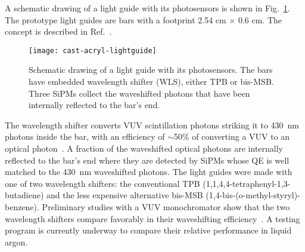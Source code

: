 A schematic drawing of a light guide with its photosensors is shown in
Fig.~\ref{fig:WaveguideSketch}. The prototype light guides are bars
with a footprint 2.54 cm $\times$ 0.6 cm.  The concept is described in
Ref.~\cite{bib:MITbars}.
\begin{figure}[ht]
  \begin{center}
    \texttt{[image: cast-acryl-lightguide]}
    \caption{Schematic drawing of a light guide with its
      photosensors. The bars have embedded wavelength shifter (WLS),
      either TPB or bis-MSB. Three SiPMs collect the waveshifted
      photons that have been internally reflected to the bar's end.}
    \label{fig:WaveguideSketch}
  \end{center}
\end{figure}
The wavelength shifter converts VUV scintillation photons striking it
to 430~nm photons inside the bar, with an efficiency of $\sim$50\% of
converting a VUV to an optical photon~\cite{bib:gehman}.  A fraction
of the waveshifted optical photons are internally reflected to the
bar's end where they are detected by SiPMs whose QE is well matched to
the 430~nm waveshifted photons. The light guides were made with one of
two wavelength shifters: the conventional TPB
(1,1,4,4-tetraphenyl-1,3-butadiene) and the less expensive alternative
bis-MSB (1,4-bis-(o-methyl-styryl)-benzene). Preliminary studies with
a VUV monochromator show that the two wavelength shifters compare
favorably in their waveshifting efficiency~\cite{bib:baptistaJINST}. A
testing program is currently underway to compare their relative
performance in liquid argon.


